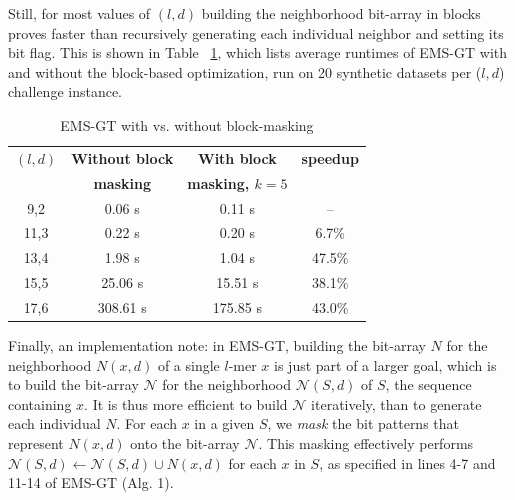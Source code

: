 \documentclass{acm_proc_article-sp}
\begin{document}
			Still, for most values of $(l,d)$ building the neighborhood bit-array in blocks proves faster than recursively generating each individual neighbor and setting its bit flag. This is shown in Table ~\ref{tbl:speedup_blockmasking}, which lists average runtimes of EMS-GT with and without the block-based optimization, run on 20 synthetic datasets per ($l,d$) challenge instance.
			\begin{table}[h] %
				\small
				\renewcommand{\arraystretch}{1.3}
				\caption{\small EMS-GT with vs. without block-masking}
				\label{tbl:speedup_blockmasking}
				\centering
				\begin{tabular}{|c|c|c|c|}
				\hline 
				\bfseries\boldmath $(l,d)$ & \bfseries Without block & \bfseries With block & \bfseries speedup\\
				\bfseries & \bfseries masking & \bfseries\boldmath masking, $k=5$ & \bfseries\\
				\hline
				 9,2 &   0.06 s &    0.11 s &     --  \\
				11,3 &   0.22 s &    0.20 s &    6.7\%\\
				13,4 &   1.98 s &    1.04 s &   47.5\%\\
				15,5 &  25.06 s &   15.51 s &   38.1\%\\
				17,6 & 308.61 s &  175.85 s &   43.0\%\\
				\hline\end{tabular}
				\end{table}

			Finally, an implementation note: in EMS-GT, building the bit-array $N$ for the neighborhood $N(x,d)$ of a single $l$-mer $x$ is just part of a larger goal, which is to build the bit-array $\mathcal{N}$ for the neighborhood $\mathcal{N}(S,d)$ of $S$, the sequence containing $x$. It is thus more efficient to build $\mathcal{N}$ iteratively, than to generate each individual $N$. For each $x$ in a given $S$, we \emph{mask} the bit patterns that represent $N(x,d)$ onto the bit-array $\mathcal{N}$. This masking effectively performs $\mathcal{N}(S,d) \leftarrow \mathcal{N}(S,d) \cup N(x,d)$ for each $x$ in $S$, as specified in lines 4-7 and 11-14 of EMS-GT (Alg. 1).			
\end{document}
